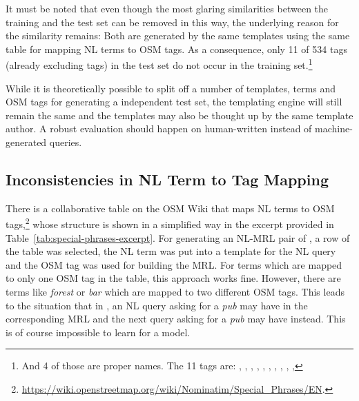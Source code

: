 It must be noted that even though the most glaring similarities between the
training and the test set can be removed in this way, the underlying reason for
the similarity remains: Both are generated by the same templates using the same
table for mapping NL terms to OSM tags. As a consequence, only 11 of
534 tags (already excluding  tags) in the test set do not occur
in the training set.\footnote{And 4 of those are proper names. The 11 tags are:
  , ,
  , ,
  , , ,
  , ,
  , }

While it is theoretically possible to split off a number of templates, terms and
OSM tags for generating a independent test set, the templating engine will still
remain the same and the templates may also be thought up by the same template
author. A robust evaluation should happen on human-written instead of
machine-generated queries.

\subsection{Inconsistencies in NL Term to Tag Mapping}

There is a collaborative table on the OSM Wiki that maps NL terms to OSM
tags,\footnote{\url{https://wiki.openstreetmap.org/wiki/Nominatim/Special_Phrases/EN}.}
whose structure is shown in a simplified way in the excerpt provided in
Table~\ref{tab:special-phrases-excerpt}. For generating an NL-MRL pair of
\nlmapstwo{}, a row of the table was selected, the NL term was put into a
template for the NL query and the OSM tag was used for building the MRL. For
terms which are mapped to only one OSM tag in the table, this approach works
fine. However, there are terms like \emph{forest} or \emph{bar} which are mapped
to two different OSM tags. This leads to the situation that in \nlmapstwo{}, an
NL query asking for a \emph{pub} may have  in the
corresponding MRL and the next query asking for a \emph{pub} may have
 instead. This is of course impossible to learn for a model.

